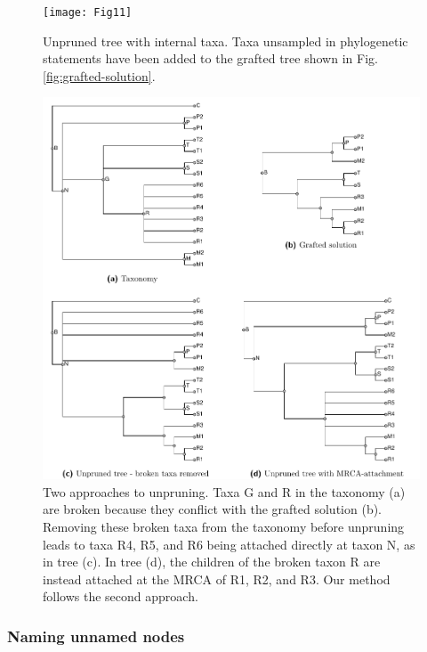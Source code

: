 \documentclass[fleqn,12pt,lineno,english]{wlpeerj}
\begin{document}
\begin{figure}
  
\begin{centering}
\texttt{[image: Fig11]}
\par\end{centering}
\caption{\label{fig:unprune}Unpruned tree with internal taxa. Taxa unsampled in phylogenetic
statements have been added to the grafted tree shown
in Fig. \ref{fig:grafted-solution}.}
\end{figure}

\begin{figure}
\includegraphics[width=1.0\textwidth]{Fig12}  

\caption{\label{fig:Two-approaches-to-unpruning}Two approaches to unpruning.
Taxa G and R in the taxonomy (a) are broken because they conflict
with the grafted solution (b). Removing these broken taxa from the
taxonomy before unpruning leads to taxa R4, R5, and R6 being attached
directly at taxon N, as in tree (c). In tree (d), the children of
the broken taxon R are instead attached at the MRCA of R1, R2, and
R3. Our method follows the second approach.}
\end{figure}


\subsubsection{Naming unnamed nodes}
\end{document}

